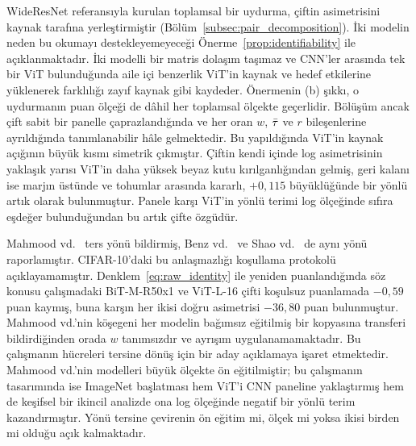 WideResNet referansıyla kurulan toplamsal bir uydurma, çiftin asimetrisini kaynak tarafına yerleştirmiştir (Bölüm~\ref{subsec:pair_decomposition}). İki modelin neden bu okumayı destekleyemeyeceği Önerme~\ref{prop:identifiability} ile açıklanmaktadır. İki modelli bir matris dolaşım taşımaz ve CNN'ler arasında tek bir ViT bulunduğunda aile içi benzerlik ViT'in kaynak ve hedef etkilerine yüklenerek farklılığı zayıf kaynak gibi kaydeder. Önermenin (b) şıkkı, o uydurmanın puan ölçeği de dâhil her toplamsal ölçekte geçerlidir. Bölüşüm ancak çift sabit bir panelle çaprazlandığında ve her oran $w$, $\bar{\tau}$ ve $r$ bileşenlerine ayrıldığında tanımlanabilir hâle gelmektedir. Bu yapıldığında ViT'in kaynak açığının büyük kısmı simetrik çıkmıştır. Çiftin kendi içinde log asimetrisinin yaklaşık yarısı ViT'in daha yüksek beyaz kutu kırılganlığından gelmiş, geri kalanı ise marjın üstünde ve tohumlar arasında kararlı, $+0{,}115$ büyüklüğünde bir yönlü artık olarak bulunmuştur. Panele karşı ViT'in yönlü terimi log ölçeğinde sıfıra eşdeğer bulunduğundan bu artık çifte özgüdür.

Mahmood vd.~\cite{mahmood2021robustness} ters yönü bildirmiş, Benz vd.~\cite{benz2021adversarial} ve Shao vd.~\cite{shao2022adversarial} de aynı yönü raporlamıştır. CIFAR-10'daki bu anlaşmazlığı koşullama protokolü açıklayamamıştır. Denklem~\eqref{eq:raw_identity} ile yeniden puanlandığında söz konusu çalışmadaki BiT-M-R50x1 ve ViT-L-16 çifti koşulsuz puanlamada $-0{,}59$ puan kaymış, buna karşın her ikisi doğru asimetrisi $-36{,}80$ puan bulunmuştur. Mahmood vd.'nin köşegeni her modelin bağımsız eğitilmiş bir kopyasına transferi bildirdiğinden orada $w$ tanımsızdır ve ayrışım uygulanamamaktadır. Bu çalışmanın hücreleri tersine dönüş için bir aday açıklamaya işaret etmektedir. Mahmood vd.'nin modelleri büyük ölçekte ön eğitilmiştir; bu çalışmanın tasarımında ise ImageNet başlatması hem ViT'i CNN paneline yaklaştırmış hem de keşifsel bir ikincil analizde ona log ölçeğinde negatif bir yönlü terim kazandırmıştır. Yönü tersine çevirenin ön eğitim mi, ölçek mi yoksa ikisi birden mi olduğu açık kalmaktadır.

